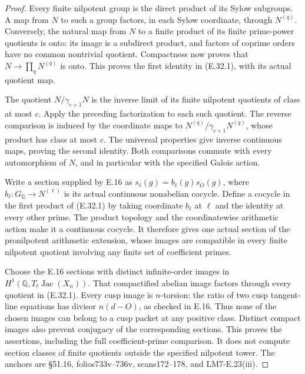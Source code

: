 \begin{proof}
Every finite nilpotent group is the direct product of its
Sylow subgroups. A map from $N$ to such a group factors,
in each Sylow coordinate, through $N^{(q)}$. Conversely,
the natural map from $N$ to a finite product of its finite
prime-power quotients is onto: its image is a subdirect
product, and factors of coprime orders have no common
nontrivial quotient. Compactness now proves that
$N\to\prod_qN^{(q)}$ is onto. This proves the first
identity in (E.32.1), with its actual quotient map.

The quotient $N/\gamma_{c+1}N$ is the inverse limit of
its finite nilpotent quotients of class at most $c$.
Apply the preceding factorization to each such quotient.
The reverse comparison is induced by the coordinate
maps to $N^{(q)}/\gamma_{c+1}N^{(q)}$, whose product has
class at most $c$. The universal properties give inverse
continuous maps, proving the second identity. Both
comparisons commute with every automorphism of $N$,
and in particular with the specified Galois action.

Write a section supplied by E.16 as
$s_\ell(g)=b_\ell(g)s_O(g)$, where
$b_\ell:G_{\mathbb Q}\to N^{(\ell)}$ is its actual
continuous nonabelian cocycle. Define a cocycle in the
first product of (E.32.1) by taking coordinate
$b_\ell$ at $\ell$ and the identity at every other prime.
The product topology and the coordinatewise arithmetic
action make it a continuous cocycle. It therefore gives
one actual section of the pronilpotent arithmetic
extension, whose images are compatible in every
finite nilpotent quotient involving any finite set
of coefficient primes.

Choose the E.16 sections with distinct infinite-order
images in
$H^1(\mathbb Q,T_\ell\operatorname{Jac}(X_n))$.
That compactified abelian image factors through every
quotient in (E.32.1). Every cusp image is $n$-torsion:
the ratio of two cusp tangent-line equations has
divisor $n(d-O)$, as checked in E.16. Thus none of the
chosen images can belong to a cusp packet at any
positive class. Distinct compact images also prevent
conjugacy of the corresponding sections. This proves
the assertions, including the full coefficient-prime
comparison. It does not compute section classes of
finite quotients outside the specified nilpotent
tower. The anchors are \S51.16, folios733v--736v,
scans172--178, and LM7-E.23(iii).
\end{proof}

